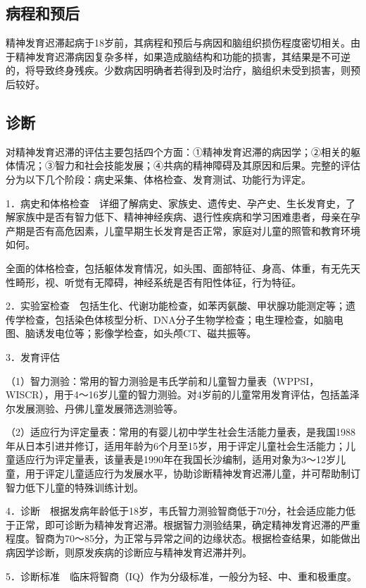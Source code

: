 \subsection{病程和预后}

精神发育迟滞起病于18岁前，其病程和预后与病因和脑组织损伤程度密切相关。由于精神发育迟滞病因复杂多样，如果造成脑结构和功能的损害，其结果是不可逆的，将导致终身残疾。少数病因明确者若得到及时治疗，脑组织未受到损害，则预后较好。

\subsection{诊断}

对精神发育迟滞的评估主要包括四个方面：①精神发育迟滞的病因学；②相关的躯体情况；③智力和社会技能发展；④共病的精神障碍及其原因和后果。完整的评估分为以下几个阶段：病史采集、体格检查、发育测试、功能行为评定。

1．病史和体格检查　详细了解病史、家族史、遗传史、孕产史、生长发育史，了解家族中是否有智力低下、精神神经疾病、退行性疾病和学习困难患者，母亲在孕产期是否有高危因素，儿童早期生长发育是否正常，家庭对儿童的照管和教育环境如何。

全面的体格检查，包括躯体发育情况，如头围、面部特征、身高、体重，有无先天性畸形，视、听觉有无障碍，神经系统是否有阳性体征，行为特征。

2．实验室检查　包括生化、代谢功能检查，如苯丙氨酸、甲状腺功能测定等；遗传学检查，包括染色体核型分析、DNA分子生物学检查；电生理检查，如脑电图、脑诱发电位等；影像学检查，如头颅CT、磁共振等。

3．发育评估

（1）智力测验：常用的智力测验是韦氏学前和儿童智力量表（WPPSI，WISCR），用于4～16岁儿童的智力测验。对4岁前的儿童常用发育评估，包括盖泽尔发展测验、丹佛儿童发展筛选测验等。

（2）适应行为评定量表：常用的有婴儿初中学生社会生活能力量表，是我国1988年从日本引进并修订，适用年龄为6个月至15岁，用于评定儿童社会生活能力；儿童适应行为评定量表，该量表是1990年在我国长沙编制，适用对象为3～12岁儿童，用于评定儿童适应行为发展水平，协助诊断精神发育迟滞儿童，并可帮助制订智力低下儿童的特殊训练计划。

4．诊断　根据发病年龄低于18岁，韦氏智力测验智商低于70分，社会适应能力低于正常，即可诊断为精神发育迟滞。根据智力测验结果，确定精神发育迟滞的严重程度。智商为70～85分，为正常与异常之间的边缘状态。根据检查结果，如能做出病因学诊断，则原发疾病的诊断应与精神发育迟滞并列。

5．诊断标准　临床将智商（IQ）作为分级标准，一般分为轻、中、重和极重度。

